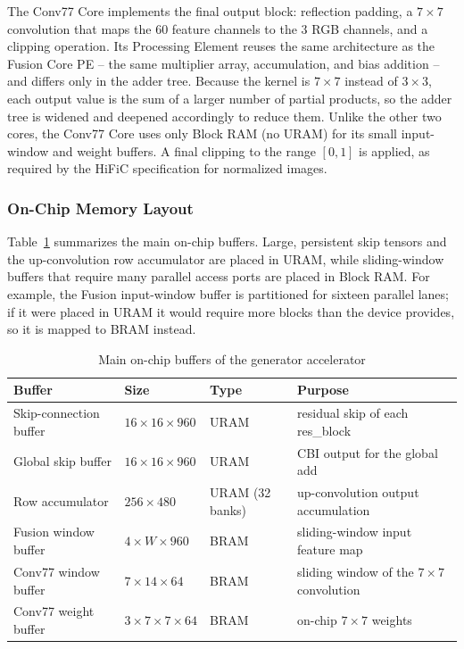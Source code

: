 The Conv77 Core implements the final output block: reflection padding, a $7\times7$ convolution that maps the 60 feature channels to the 3 RGB channels, and a clipping operation. Its Processing Element reuses the same architecture as the Fusion Core PE -- the same multiplier array, accumulation, and bias addition -- and differs only in the adder tree. Because the kernel is $7\times7$ instead of $3\times3$, each output value is the sum of a larger number of partial products, so the adder tree is widened and deepened accordingly to reduce them. Unlike the other two cores, the Conv77 Core uses only Block RAM (no URAM) for its small input-window and weight buffers. A final clipping to the range $[0,1]$ is applied, as required by the HiFiC specification for normalized images.

\subsubsection{On-Chip Memory Layout}

Table~\ref{tab:onchip_buffers} summarizes the main on-chip buffers. Large, persistent skip tensors and the up-convolution row accumulator are placed in URAM, while sliding-window buffers that require many parallel access ports are placed in Block RAM. For example, the Fusion input-window buffer is partitioned for sixteen parallel lanes; if it were placed in URAM it would require more blocks than the device provides, so it is mapped to BRAM instead.

\begin{table}[H]
\centering
\caption{Main on-chip buffers of the generator accelerator}
\label{tab:onchip_buffers}
\begin{tabularx}{\textwidth}{|>{\raggedright\arraybackslash}p{}|>{\raggedright\arraybackslash}p{}|>{\raggedright\arraybackslash}p{}|X|}
\hline
\textbf{Buffer} & \textbf{Size} & \textbf{Type} & \textbf{Purpose} \\
\hline
Skip-connection buffer & $16\times16\times960$ & URAM & residual skip of each res\_block \\
\hline
Global skip buffer & $16\times16\times960$ & URAM & CBI output for the global add \\
\hline
Row accumulator & $256\times480$ & URAM (32 banks) & up-convolution output accumulation \\
\hline
Fusion window buffer & $4\times W\times960$ & BRAM & sliding-window input feature map \\
\hline
Conv77 window buffer & $7\times14\times64$ & BRAM & sliding window of the $7\times7$ convolution \\
\hline
Conv77 weight buffer & $3\times7\times7\times64$ & BRAM & on-chip $7\times7$ weights \\
\hline
\end{tabularx}
\end{table}

